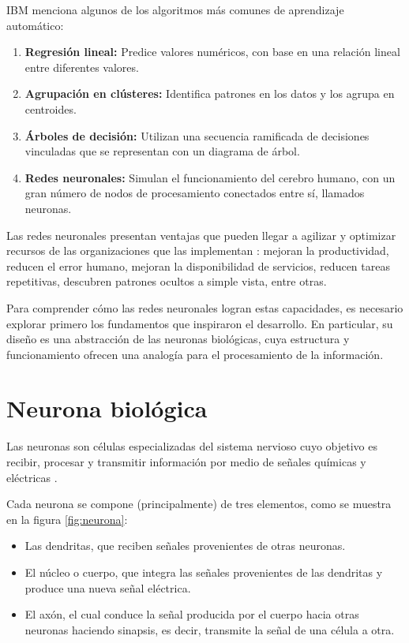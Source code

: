 IBM \cite{ibm_ml} menciona algunos de los algoritmos más comunes de aprendizaje automático:

\begin{enumerate}
	\item \textbf{Regresión lineal:} Predice valores numéricos, con base en una relación lineal entre diferentes valores.
	
	\item \textbf{Agrupación en clústeres:} Identifica patrones en los datos y los agrupa en centroides.
	
	\item \textbf{Árboles de decisión:} Utilizan una secuencia ramificada de decisiones vinculadas que se representan con un diagrama de árbol.
	
	\item \textbf{Redes neuronales:} Simulan el funcionamiento del cerebro humano, con un gran número de nodos de procesamiento conectados entre sí, llamados neuronas.
\end{enumerate}

Las redes neuronales presentan ventajas que pueden llegar a agilizar y optimizar recursos de las organizaciones que las implementan \cite{adobe_ml}: mejoran la productividad, reducen el error humano, mejoran la disponibilidad de servicios, reducen tareas repetitivas, descubren patrones ocultos a simple vista, entre otras.

Para comprender cómo las redes neuronales logran estas capacidades, es necesario explorar primero los fundamentos que inspiraron el desarrollo. En particular, su diseño es una abstracción de las neuronas biológicas, cuya estructura y funcionamiento ofrecen una analogía para el procesamiento de la información.

\section{Neurona biológica}

Las neuronas son células especializadas del sistema nervioso cuyo objetivo es recibir, procesar y transmitir información por medio de señales químicas y eléctricas \cite{navarra_neurona, bordoli2023_neurona}. 

Cada neurona se compone (principalmente) de tres elementos, como se muestra en la figura \ref{fig:neurona}: 

\begin{itemize}
	
	\item Las dendritas, que reciben señales provenientes de otras neuronas.
	
	\item El núcleo o cuerpo, que integra las señales provenientes de las dendritas y produce una nueva señal eléctrica.
	
	\item El axón, el cual conduce la señal producida por el cuerpo hacia otras neuronas haciendo sinapsis, es decir, transmite la señal de una célula a otra.
	
\end{itemize}

